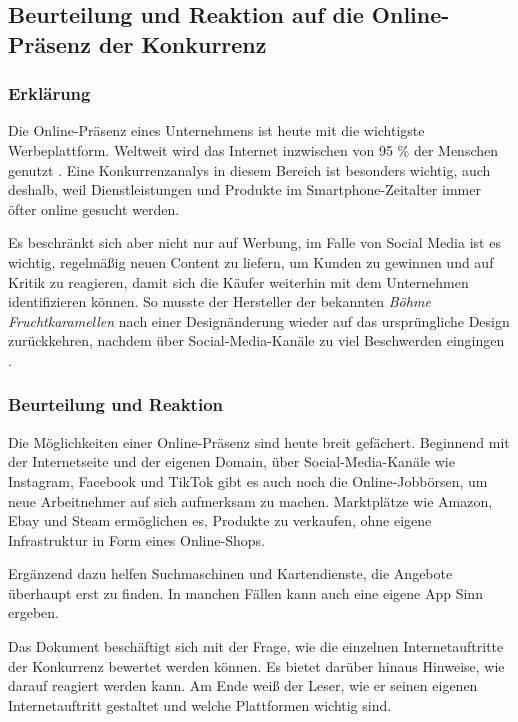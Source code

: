 \subsection{Beurteilung und Reaktion auf die Online-Präsenz der Konkurrenz}

\subsubsection*{Erklärung}

Die Online-Präsenz eines Unternehmens ist heute mit die wichtigste Werbeplattform. Weltweit wird das Internet inzwischen von 95 \% der Menschen genutzt \cite{internetnutzerBU}. Eine Konkurrenzanalys in diesem Bereich ist besonders wichtig, auch deshalb, weil Dienstleistungen und Produkte im Smartphone-Zeitalter immer öfter online gesucht werden.

Es beschränkt sich aber nicht nur auf Werbung, im Falle von Social Media ist es wichtig, regelmäßig neuen Content zu liefern, um Kunden zu gewinnen und auf Kritik zu reagieren, damit sich die Käufer weiterhin mit dem Unternehmen identifizieren können. So musste der Hersteller der bekannten \textit{Böhme Fruchtkaramellen} nach einer Designänderung wieder auf das ursprüngliche Design zurückkehren, nachdem über Social-Media-Kanäle zu viel Beschwerden eingingen \cite{fruchtkaramellenBU}.

\subsubsection*{Beurteilung und Reaktion}

Die Möglichkeiten einer Online-Präsenz sind heute breit gefächert. Beginnend mit der Internetseite und der eigenen Domain, über Social-Media-Kanäle wie Instagram, Facebook und TikTok gibt es auch noch die Online-Jobbörsen, um neue Arbeitnehmer auf sich aufmerksam zu machen. Marktplätze wie Amazon, Ebay und Steam ermöglichen es, Produkte zu verkaufen, ohne eigene Infrastruktur in Form eines Online-Shops.

Ergänzend dazu helfen Suchmaschinen und Kartendienste, die Angebote überhaupt erst zu finden. In manchen Fällen kann auch eine eigene App Sinn ergeben.

Das Dokument beschäftigt sich mit der Frage, wie die einzelnen Internetauftritte der Konkurrenz bewertet werden können. Es bietet darüber hinaus Hinweise, wie darauf reagiert werden kann. Am Ende weiß der Leser, wie er seinen eigenen Internetauftritt gestaltet und welche Plattformen wichtig sind.

